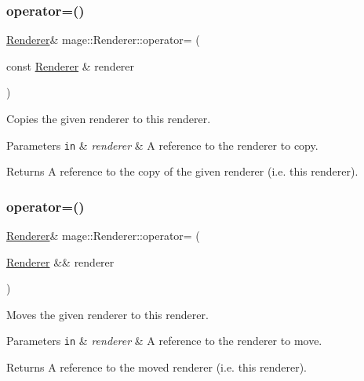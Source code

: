 \subsubsection{\texorpdfstring{operator=()}{operator=()}\hspace{0.1cm}{\footnotesize\ttfamily [1/2]}}
{\footnotesize\ttfamily \hyperlink{classmage_1_1_renderer}{Renderer}\& mage\+::\+Renderer\+::operator= (\begin{DoxyParamCaption}\item[{const \hyperlink{classmage_1_1_renderer}{Renderer} \&}]{renderer }\end{DoxyParamCaption})\hspace{0.3cm}{\ttfamily [delete]}}

Copies the given renderer to this renderer.


\begin{DoxyParams}[1]{Parameters}
\mbox{\tt in}  & {\em renderer} & A reference to the renderer to copy. \\
\hline
\end{DoxyParams}
\begin{DoxyReturn}{Returns}
A reference to the copy of the given renderer (i.\+e. this renderer). 
\end{DoxyReturn}
\hypertarget{classmage_1_1_renderer_aa381bb89bffdc8ea2d8e3625e28cd28a}{}\label{classmage_1_1_renderer_aa381bb89bffdc8ea2d8e3625e28cd28a} 
\subsubsection{\texorpdfstring{operator=()}{operator=()}\hspace{0.1cm}{\footnotesize\ttfamily [2/2]}}
{\footnotesize\ttfamily \hyperlink{classmage_1_1_renderer}{Renderer}\& mage\+::\+Renderer\+::operator= (\begin{DoxyParamCaption}\item[{\hyperlink{classmage_1_1_renderer}{Renderer} \&\&}]{renderer }\end{DoxyParamCaption})\hspace{0.3cm}{\ttfamily [delete]}}

Moves the given renderer to this renderer.


\begin{DoxyParams}[1]{Parameters}
\mbox{\tt in}  & {\em renderer} & A reference to the renderer to move. \\
\hline
\end{DoxyParams}
\begin{DoxyReturn}{Returns}
A reference to the moved renderer (i.\+e. this renderer). 
\end{DoxyReturn}
\hypertarget{classmage_1_1_renderer_af18ff4c3d4a9c6d9ec9b30fdb5ad3455}{}\label{classmage_1_1_renderer_af18ff4c3d4a9c6d9ec9b30fdb5ad3455} 
